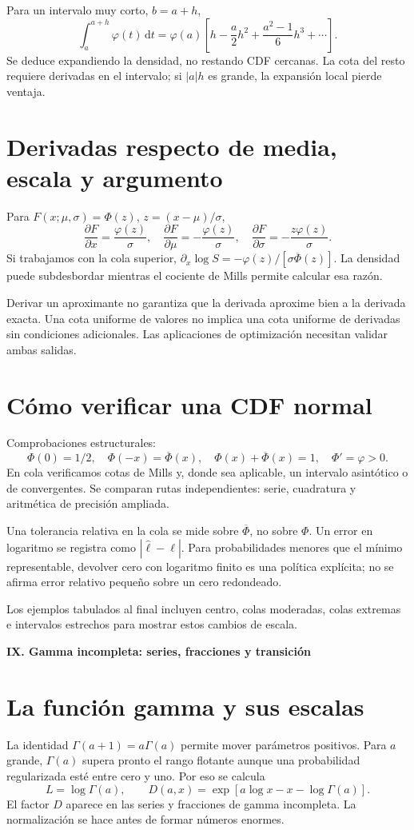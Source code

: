 \documentclass[11pt,a4paper]{article}
\newcommand{\dd}{\,\mathrm d}
\theoremstyle{definition}
\newcommand{\parte}[1]{\par\bigskip\Needspace{8\baselineskip}\begin{center}{\Large\bfseries\color{azul}#1}\end{center}}
\newcommand{\ph}{\varphi}
\newcommand{\Q}{\overline\Phi}
\begin{document}
Para un intervalo muy corto, $b=a+h$,
\[
\int_a^{a+h}\ph(t)\dd t
=\ph(a)\left[h-\frac a2h^2+\frac{a^2-1}{6}h^3+\cdots\right].
\]
Se deduce expandiendo la densidad, no restando CDF cercanas. La cota del resto requiere derivadas en el intervalo; si $|a|h$ es grande, la expansión local pierde ventaja.

\section{Derivadas respecto de media, escala y argumento}
Para $F(x;\mu,\sigma)=\Phi(z)$, $z=(x-\mu)/\sigma$,
\[
\frac{\partial F}{\partial x}=\frac{\ph(z)}\sigma,\quad
\frac{\partial F}{\partial\mu}=-\frac{\ph(z)}\sigma,\quad
\frac{\partial F}{\partial\sigma}=-\frac{z\ph(z)}\sigma.
\]
Si trabajamos con la cola superior,
$\partial_x\log S=-\ph(z)/[\sigma\Q(z)]$.
La densidad puede subdesbordar mientras el cociente de Mills permite calcular esa razón.

Derivar un aproximante no garantiza que la derivada aproxime bien a la derivada exacta. Una cota uniforme de valores no implica una cota uniforme de derivadas sin condiciones adicionales. Las aplicaciones de optimización necesitan validar ambas salidas.

\section{Cómo verificar una CDF normal}
Comprobaciones estructurales:
\[
\Phi(0)=1/2,\quad \Phi(-x)=\Q(x),\quad
\Phi(x)+\Q(x)=1,\quad \Phi'\!=\ph>0.
\]
En cola verificamos cotas de Mills y, donde sea aplicable, un intervalo asintótico o de convergentes. Se comparan rutas independientes: serie, cuadratura y aritmética de precisión ampliada.

Una tolerancia relativa en la cola se mide sobre $\Q$, no sobre $\Phi$. Un error en logaritmo se registra como $|\widehat\ell-\ell|$. Para probabilidades menores que el mínimo representable, devolver cero con logaritmo finito es una política explícita; no se afirma error relativo pequeño sobre un cero redondeado.

Los ejemplos tabulados al final incluyen centro, colas moderadas, colas extremas e intervalos estrechos para mostrar estos cambios de escala.


\parte{IX. Gamma incompleta: series, fracciones y transición}
\section{La función gamma y sus escalas}
La identidad $\Gamma(a+1)=a\Gamma(a)$ permite mover parámetros positivos. Para $a$ grande, $\Gamma(a)$ supera pronto el rango flotante aunque una probabilidad regularizada esté entre cero y uno. Por eso se calcula
\[
L=\log\Gamma(a),\qquad
D(a,x)=\exp[a\log x-x-\log\Gamma(a)].
\]
El factor $D$ aparece en las series y fracciones de gamma incompleta. La normalización se hace antes de formar números enormes.
\end{document}
